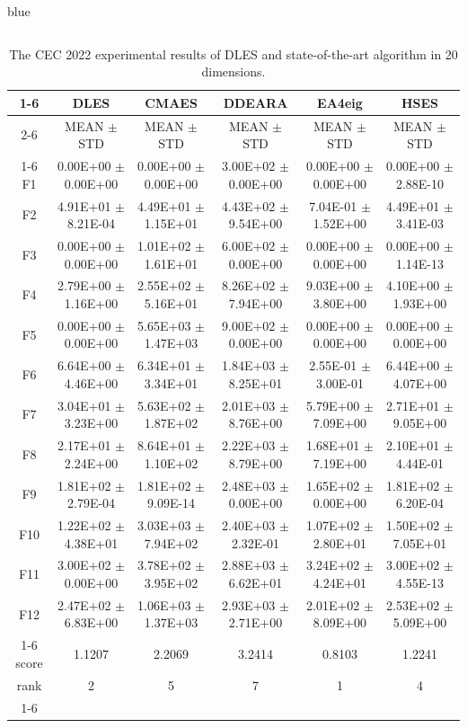 \documentclass[journal, onecolumn]{IEEEtran}
\begin{document}
\begin{color}{blue}
\begin{table}[htbp!]
\begin{tabular}{c|ccccc}
	\end{tabular}
\end{table}

\begin{table}[htbp!]
	\centering
	\caption{The CEC 2022 experimental results of DLES and state-of-the-art algorithm in 20 dimensions.}
	\label{CEC2022_20}
		\begin{tabular}{c|ccccc}
			\cline{1-6}
		 &	DLES			 &	CMAES				 &	DDEARA				 &	EA4eig				 &	HSES			\\	\cline{2-6}	
	&	MEAN	$\pm$	STD	 &	MEAN	$\pm$	STD		 &	MEAN	$\pm$	STD		 &	MEAN	$\pm$	STD		 &	MEAN	$\pm$	STD	\\	\cline{1-6}
	F1	 &	0.00E+00	$\pm$	0.00E+00	 &	0.00E+00	$\pm$	0.00E+00		 &	3.00E+02	$\pm$	0.00E+00		 &	0.00E+00	$\pm$	0.00E+00		 &	0.00E+00	$\pm$	2.88E-10	\\	
	F2	 &	4.91E+01	$\pm$	8.21E-04	 &	4.49E+01	$\pm$	1.15E+01		 &	4.43E+02	$\pm$	9.54E+00		 &	7.04E-01	$\pm$	1.52E+00		 &	4.49E+01	$\pm$	3.41E-03	\\	
	F3	 &	0.00E+00	$\pm$	0.00E+00	 &	1.01E+02	$\pm$	1.61E+01		 &	6.00E+02	$\pm$	0.00E+00		 &	0.00E+00	$\pm$	0.00E+00		 &	0.00E+00	$\pm$	1.14E-13	\\	
	F4	 &	2.79E+00	$\pm$	1.16E+00	 &	2.55E+02	$\pm$	5.16E+01		 &	8.26E+02	$\pm$	7.94E+00		 &	9.03E+00	$\pm$	3.80E+00		 &	4.10E+00	$\pm$	1.93E+00	\\	
	F5	 &	0.00E+00	$\pm$	0.00E+00	 &	5.65E+03	$\pm$	1.47E+03		 &	9.00E+02	$\pm$	0.00E+00		 &	0.00E+00	$\pm$	0.00E+00		 &	0.00E+00	$\pm$	0.00E+00	\\	
	F6	 &	6.64E+00	$\pm$	4.46E+00	 &	6.34E+01	$\pm$	3.34E+01		 &	1.84E+03	$\pm$	8.25E+01		 &	2.55E-01	$\pm$	3.00E-01		 &	6.44E+00	$\pm$	4.07E+00	\\	
	F7	 &	3.04E+01	$\pm$	3.23E+00	 &	5.63E+02	$\pm$	1.87E+02		 &	2.01E+03	$\pm$	8.76E+00		 &	5.79E+00	$\pm$	7.09E+00		 &	2.71E+01	$\pm$	9.05E+00	\\	
	F8	 &	2.17E+01	$\pm$	2.24E+00	 &	8.64E+01	$\pm$	1.10E+02		 &	2.22E+03	$\pm$	8.79E+00		 &	1.68E+01	$\pm$	7.19E+00		 &	2.10E+01	$\pm$	4.44E-01	\\	
	F9	 &	1.81E+02	$\pm$	2.79E-04	 &	1.81E+02	$\pm$	9.09E-14		 &	2.48E+03	$\pm$	0.00E+00		 &	1.65E+02	$\pm$	0.00E+00		 &	1.81E+02	$\pm$	6.20E-04	\\	
	F10	 &	1.22E+02	$\pm$	4.38E+01	 &	3.03E+03	$\pm$	7.94E+02		 &	2.40E+03	$\pm$	2.32E-01		 &	1.07E+02	$\pm$	2.80E+01		 &	1.50E+02	$\pm$	7.05E+01	\\	
	F11	 &	3.00E+02	$\pm$	0.00E+00	 &	3.78E+02	$\pm$	3.95E+02		 &	2.88E+03	$\pm$	6.62E+01		 &	3.24E+02	$\pm$	4.24E+01		 &	3.00E+02	$\pm$	4.55E-13	\\	
	F12	 &	2.47E+02	$\pm$	6.83E+00	 &	1.06E+03	$\pm$	1.37E+03		 &	2.93E+03	$\pm$	2.71E+00		 &	2.01E+02	$\pm$	8.09E+00		 &	2.53E+02	$\pm$	5.09E+00	\\	\cline{1-6}
	score		& 1.1207 & 2.2069 & 3.2414 & 0.8103 & 1.2241											\\												
	rank	 	& 2 & 5 & 7 & 1 & 4											\\	\cline{1-6}											
																					

\end{tabular}
\end{table}
\end{color}
\end{document}
